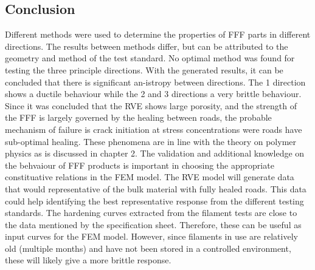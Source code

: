 \subsection{Conclusion}
Different methods were used to determine the properties of FFF parts in different directions. The results between methods differ, but can be attributed to the geometry and method of the test standard. No optimal method was found for testing the three principle directions. With the generated results, it can be concluded that there is significant an-istropy  between directions. The 1 direction shows a ductile behaviour while the 2 and 3 directions a very brittle behaviour. Since it was concluded that the RVE shows large porosity, and the strength of the FFF is largely governed by the healing  between roads, the probable mechanism of failure is crack initiation at stress concentrations were roads have sub-optimal healing. These phenomena are in line with the theory on polymer physics as is discussed in chapter 2. The validation and additional knowledge on the behvaiour of FFF products is important in choosing the appropriate constituative relations in the FEM model.  
The RVE model will generate data that would representative of the bulk material with fully healed roads. This data could help identifying the best representative response from the different testing standards.
The hardening curves extracted from the filament tests are close to the data mentioned by the specification sheet. Therefore, these can be useful as input curves for the FEM model. However, since filaments in use are relatively old (multiple months) and have not been stored in a controlled environment, these will likely give a more brittle response. 


